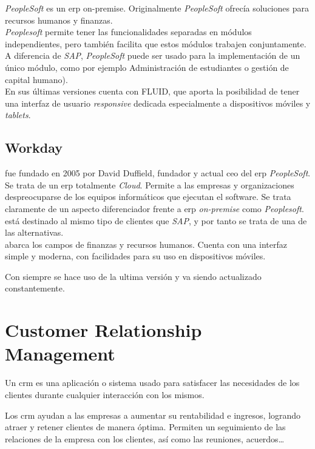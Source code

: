 \textit{PeopleSoft} es un \acrshort{erp} \gls{on-premise}.
Originalmente \textit{PeopleSoft} ofrecía soluciones para recursos humanos y finanzas.\\

\textit{Peoplesoft} permite tener las funcionalidades separadas en módulos independientes, pero también facilita que estos módulos trabajen conjuntamente.
A diferencia de \textit{SAP}, \textit{PeopleSoft} puede ser usado para la implementación de un único módulo, como por ejemplo Administración de estudiantes o gestión de capital humano).\\

En sus últimas versiones cuenta con FLUID, que aporta la posibilidad de tener una interfaz de usuario \textit{responsive} dedicada especialmente a dispositivos móviles y \textit{tablets}.



\subsection{Workday}
\wday{} fue fundado en 2005 por David Duffield, fundador y actual \acrshort{ceo} del \acrshort{erp} \textit{PeopleSoft}.\\



Se trata de un \acrshort{erp} totalmente \textit{Cloud}. Permite a las empresas y organizaciones despreocuparse de los equipos informáticos que ejecutan el software. Se trata claramente de un aspecto diferenciador frente a \acrshort{erp} \textit{on-premise} como \textit{Peoplesoft}. 
\wday{} está destinado al mismo tipo de clientes que \textit{SAP}, y por tanto se trata de una de las alternativas.\\


\wday{} abarca los campos de finanzas y recursos humanos. Cuenta con una interfaz simple y moderna, con facilidades para su uso en dispositivos móviles.

Con \wday{} siempre se hace uso de la ultima versión y va siendo actualizado constantemente.


\section{Customer Relationship Management}

Un \acrfull{crm} es una aplicación o sistema usado para satisfacer las necesidades de los clientes durante cualquier interacción con los mismos.

Los \acrshort{crm} ayudan a las empresas a aumentar su rentabilidad e ingresos, logrando atraer y retener clientes de manera óptima. 
Permiten un seguimiento de las relaciones de la empresa con los clientes, así como las reuniones, acuerdos\ldots


